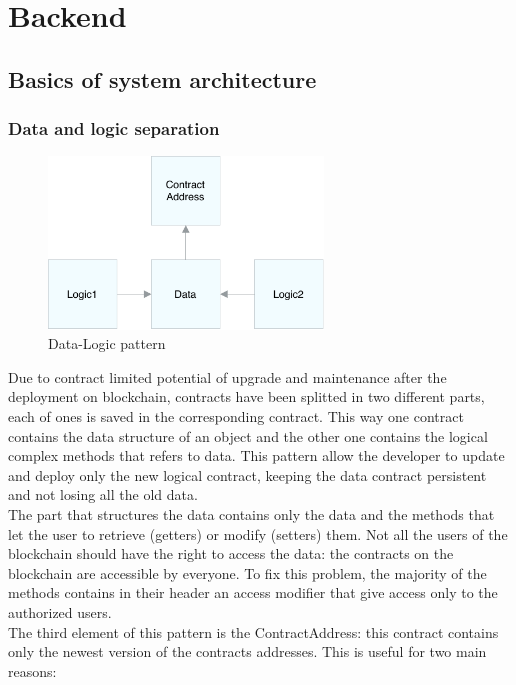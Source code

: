 \section{Backend}

\subsection{Basics of system architecture}
\subsubsection{Data and logic separation}\label{DataLogic}
\begin{figure}[!h]
	\centering
	\includegraphics[width=0.65\textwidth]{img/DataLogic.pdf}
	\caption{Data-Logic pattern}
\end{figure}
Due to contract limited potential of upgrade and maintenance after the deployment on blockchain, contracts have been splitted in two different parts, each of ones is saved in the corresponding contract. This way one contract contains the data structure of an object and the other one contains the logical complex methods that refers to data.
This pattern allow the developer to update and deploy only the new logical contract, keeping the data contract persistent and not losing all the old data. \\
The part that structures the data contains only the data and the methods that let the user to retrieve (getters) or modify (setters) them. Not all the users of the blockchain should have the right to access the data: the contracts on the blockchain are accessible by everyone. To fix this problem, the majority of the methods contains in their header an access modifier that give access only to the authorized users. \\
The third element of this pattern is the ContractAddress: this contract contains only the newest version of the contracts addresses. This is useful for two main reasons:
